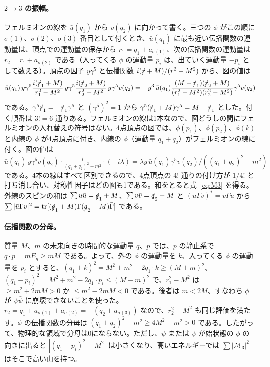 \documentclass[a4paper,10pt]{ltjsarticle}
\begin{document}
\paragraph{$2\to3$ の振幅。}フェルミオンの線を $\bar u(q_1)$ から $v(q_2)$ に向かって書く。三つの $\phi$ がこの順に $\sigma(1)$、$\sigma(2)$、$\sigma(3)$ 番目として付くとき、$\bar u(q_1)$ に最も近い伝播関数の運動量は、頂点での運動量の保存から $r_1=q_1+a_{\sigma(1)}$、次の伝播関数の運動量は $r_2=r_1+a_{\sigma(2)}$ である（入ってくる $\phi$ の運動量 $p_i$ は、出ていく運動量 $-p_i$ として数える）。頂点の因子 $y\gamma^5$ と伝播関数 $i(\slashed r+M)/(r^2-M^2)$ から、図の値は
\begin{equation*}
\bar u(q_1)\,y\gamma^5\frac{i(\slashed r_1+M)}{r_1^2-M^2}\,y\gamma^5\frac{i(\slashed r_2+M)}{r_2^2-M^2}\,y\gamma^5v(q_2)
=-y^3\,\bar u(q_1)\frac{(M-\slashed r_1)(\slashed r_2+M)}{(r_1^2-M^2)(r_2^2-M^2)}\gamma^5v(q_2)
\end{equation*}
である。$\gamma^5\slashed r_1=-\slashed r_1\gamma^5$ と $(\gamma^5)^2=1$ から $\gamma^5(\slashed r_1+M)\gamma^5=M-\slashed r_1$ とした。付く順番は $3!=6$ 通りある。フェルミオンの線は1本なので、図どうしの間にフェルミオンの入れ替えの符号はない。4点頂点の図では、$\phi(p_1)$、$\phi(p_2)$、$\phi(k)$ と内線の $\phi$ が4点頂点に付き、内線の $\phi$（運動量 $q_1+q_2$）がフェルミオンの線に付く。図の値は $\bar u(q_1)\,y\gamma^5v(q_2)\cdot\frac{i}{(q_1+q_2)^2-m^2}\cdot(-i\lambda)=\lambda y\,\bar u(q_1)\gamma^5v(q_2)/((q_1+q_2)^2-m^2)$ である。4本の線はすべて区別できるので、4点頂点の $4!$ 通りの付け方が $1/4!$ と打ち消し合い、対称性因子はどの図も1である。和をとると式~\eqref{eq:M3} を得る。外線のスピンの和は $\sum u\bar u=\slashed q_1+M$、$\sum v\bar v=\slashed q_2-M$ と $(\bar u\Gamma v)^*=\bar v\bar\Gamma u$ から $\sum|\bar u\Gamma v|^2=\mathrm{tr}[(\slashed q_1+M)\Gamma(\slashed q_2-M)\bar\Gamma]$ である。

\paragraph{伝播関数の分母。}質量 $M$、$m$ の未来向きの時間的な運動量 $q$、$p$ では、$p$ の静止系で $q\cdot p=mE_q\ge mM$ である。よって、外の $\phi$ の運動量を $k$、入ってくる $\phi$ の運動量を $p_i$ とすると、$(q_1+k)^2=M^2+m^2+2q_1\cdot k\ge(M+m)^2$、$(q_1-p_i)^2=M^2+m^2-2q_1\cdot p_i\le(M-m)^2$ で、$r_1^2-M^2$ は $\ge m^2+2mM>0$ か $\le m^2-2mM<0$ である。後者は $m<2M$、すなわち $\phi$ が $\psi\bar\psi$ に崩壊できないことを使った。$r_2=q_1+a_{\sigma(1)}+a_{\sigma(2)}=-(q_2+a_{\sigma(3)})$ なので、$r_2^2-M^2$ も同じ評価を満たす。$\phi$ の伝播関数の分母は $(q_1+q_2)^2-m^2\ge4M^2-m^2>0$ である。したがって、物理的な領域で分母は0にならない。ただし、$\psi$ または $\bar\psi$ が始状態の $\phi$ の向きに出ると $|(q_1-p_i)^2-M^2|$ は小さくなり、高いエネルギーでは $\sum|\mathcal M_3|^2$ はそこで高い山を持つ。
\end{document}
